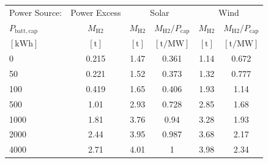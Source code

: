 \begin{table}
\label{tab: VaryBattery}
\begin{tabular}{l|c|cc|cc}
\toprule
Power Source: & Power Excess & \multicolumn{2}{|c}{Solar} & \multicolumn{2}{|c}{Wind} \\
$P_{\mathrm{batt,cap}}$ & $M_{\mathrm{H2}}$ & $M_{\mathrm{H2}}$ & $M_{\mathrm{H2}}/P_{\mathrm{cap}}$ & $M_{\mathrm{H2}}$ & $M_{\mathrm{H2}}/P_{\mathrm{cap}}$ \\
$\left[\mathrm{kWh}\right]$ & $\left[\mathrm{t}\right]$ & $\left[\mathrm{t}\right]$ & $\left[\mathrm{t/MW}\right]$ & $\left[\mathrm{t}\right]$ & $\left[\mathrm{t/MW}\right]$ \\
\midrule
0 & 0.215 & 1.47 & 0.361 & 1.14 & 0.672 \\
50 & 0.221 & 1.52 & 0.373 & 1.32 & 0.777 \\
100 & 0.419 & 1.65 & 0.406 & 1.93 & 1.14 \\
500 & 1.01 & 2.93 & 0.728 & 2.85 & 1.68 \\
1000 & 1.81 & 3.76 & 0.94 & 3.28 & 1.93 \\
2000 & 2.44 & 3.95 & 0.987 & 3.68 & 2.17 \\
4000 & 2.71 & 4.01 & 1 & 3.98 & 2.34 \\
\bottomrule
\end{tabular}
\end{table}
